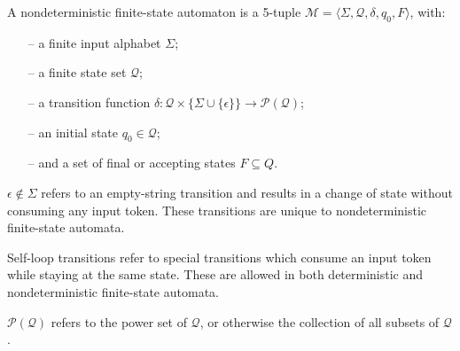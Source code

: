 \begin{definition}
  \label{def:nfa}
  A nondeterministic finite-state automaton is a 5-tuple $\mathcal{M} = \langle
  \Sigma, \mathcal{Q}, \delta, q_0, F \rangle$, with:
  \begin{itemize}
    \itemsep0em
    \item[--] a finite input alphabet $\Sigma$;
    \item[--] a finite state set $\mathcal{Q}$;
    \item[--] a transition function $\delta: \mathcal{Q} \times \{\Sigma \cup
    \{\epsilon\}\} \rightarrow \mathcal{P}(\mathcal{Q})$;
    \item[--] an initial state $q_0 \in \mathcal{Q}$;
    \item[--] and a set of final or accepting states $F \subseteq Q$.
  \end{itemize}

  \begin{remark}
    $\epsilon \notin \Sigma$ refers to an empty-string transition
    and results in a change of state without consuming any input
    token. These transitions are unique to nondeterministic finite-state automata.
  \end{remark}

  \begin{remark}
    Self-loop transitions refer to special transitions which consume an input token
    while staying at the same state. These are allowed in both deterministic and
    nondeterministic finite-state automata.
  \end{remark}
  
  \begin{remark}
    $\mathcal{P}(\mathcal{Q})$ refers to the power set of $\mathcal{Q}$, or
    otherwise the collection of all subsets of $\mathcal{Q}$.
  \end{remark}
\end{definition}


